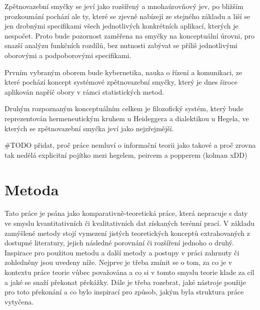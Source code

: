 \documentclass[11pt,a4paper]{article}
\begin{document}
Zpětnovazební smyčky se jeví jako rozšířený a mnohaúrovňový jev, po bližším prozkoumání pochází ale ty, které se zjevně nabízejí ze stejného základu a liší se jen drobnými specifikami všech jednotlivých konkrétních aplikací, kterých je nespočet. Proto bude pozornost zaměřena na smyčky na konceptuální úrovni, pro snazší analýzu funkčních rozdílů, bez nutnosti zabývat se příliš jednotlivými oborovými a podpoborovými specifikami.

Prvním vybraným oborem bude kybernetika, nauka o řízení a komunikaci, ze které pochází koncept systémové zpětnovazební smyčky, který je dnes široce aplikován napříč obory v rámci statistických metod.

Druhým rozpoznaným konceptuálním celkem je filozofický systém, který bude reprezentován hermeneutickým kruhem u Heideggera a dialektikou u Hegela, ve kterých se zpětnovazební smyčka jeví jako nejzřejmější.



#TODO přidat, proč práce nemluví o informační teorii jako takové a proč zrovna tak nedělá explicitní pojítko mezi hegelem, peircem a popperem (kolman xDD)



\pagebreak


\section*{Metoda}

Tato práce je psána jako komparativně-teoretická práce, která nepracuje s daty ve smyslu kvantitativních či kvalitativních dat získaných terénní prací. V základu zamýšlené metody stojí vymezení jistých teoretických konceptů extrahovaných z dostupné literatury, jejich následné porovnání či rozšíření jednoho o druhý. Inspirace pro použitou metodu a další metody a postupy v práci zahrnuty či zohledněny jsou uvedeny níže. Nejprve je třeba zmínit se o tom, za co je v kontextu práce teorie vůbec považována a co si v tomto smyslu teorie klade za cíl a jaké se snaží překonat překážky. Dále je třeba rozebrat, jaké nástroje použije pro toto překonání a co bylo inspirací pro způsob, jakým byla struktura práce vytyčena.
\end{document}
